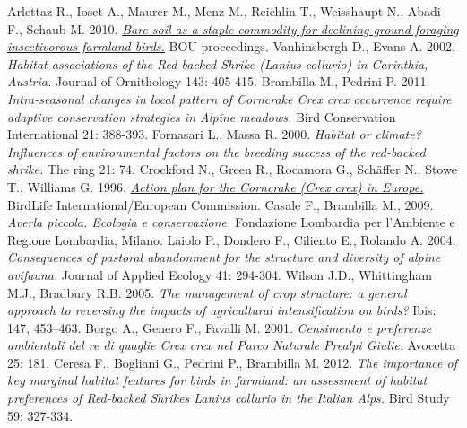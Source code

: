 \documentclass[10pt,twoside,openany,x11names,svgnames,italian,a5paper,dvipsnames,table]{memoir}
\begin{document}
\begin{thebibliography}{99}
Arlettaz R., Ioset A., Maurer M., Menz M., Reichlin T., Weisshaupt N., Abadi F., Schaub M. 2010. \href{http://www.bou.org.uk/bouproc-net/lfb3/arlettaz-etal.pdf}{\emph{Bare soil as a staple commodity for declining ground-foraging insectivorous farmland birds.}} BOU proceedings. 
Vanhinsbergh D., Evans A. 2002. \emph{Habitat associations of the Red-backed Shrike (\emph{Lanius collurio}) in Carinthia, Austria.} Journal of Ornithology 143: 405-415.
Brambilla M., Pedrini P. 2011. \emph{Intra-seasonal changes in local pattern of Corncrake \emph{Crex crex} occurrence require adaptive conservation strategies in Alpine meadows.} Bird Conservation International 21: 388-393.
Fornasari L., Massa R. 2000. \emph{Habitat or climate? Influences of environmental factors on the breeding success of the red-backed shrike.} The ring 21: 74.
Crockford N., Green R., Rocamora G., Schäffer N., Stowe T., Williams G. 1996. \href{http://ec.europa.eu/environment/nature/conservation/wildbirds/action_plans/docs/crex_crex.pdf}{\emph{Action plan for the Corncrake (\emph{Crex crex}) in Europe.}} BirdLife International/European Commission.
Casale F., Brambilla M., 2009. \emph{Averla piccola. Ecologia e conservazione.} Fondazione Lombardia per l’Ambiente e Regione Lombardia, Milano. 
Laiolo P., Dondero F., Ciliento E., Rolando A. 2004. \emph{Consequences of pastoral abandonment for the structure and diversity of alpine avifauna.} Journal of Applied Ecology 41: 294-304.
Wilson J.D., Whittingham M.J., Bradbury R.B. 2005. \emph{The management of crop structure: a general approach to reversing the impacts of agricultural intensification on birds?} Ibis: 147, 453–463.
Borgo A., Genero F., Favalli M. 2001. \emph{Censimento e preferenze ambientali del re di quaglie \emph{Crex crex} nel Parco Naturale Prealpi Giulie.} Avocetta 25: 181.
Ceresa F., Bogliani G., Pedrini P., Brambilla M. 2012. \emph{The importance of key marginal habitat features for birds in farmland: an assessment of habitat preferences of Red-backed Shrikes \emph{Lanius collurio} in the Italian Alps.} Bird Study 59: 327-334.
\setcounter{firstbib}{\value{enumiv}}
\end{thebibliography}

\makeatletter
\renewcommand\@biblabel[1]{\textcolor{MilkTea}{$\bullet$}}
\makeatother
\end{document}
